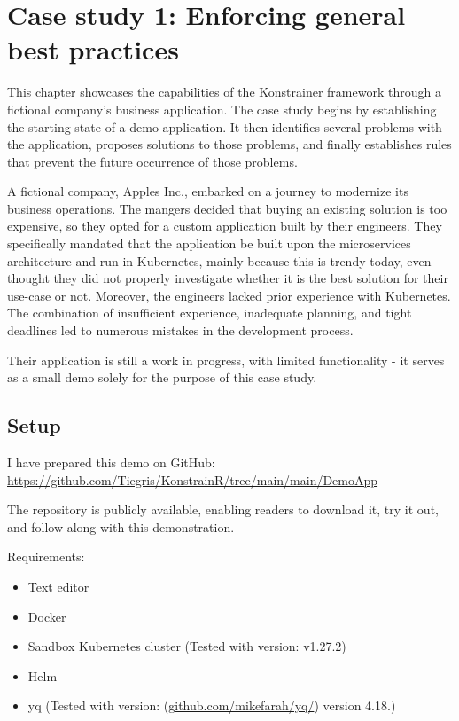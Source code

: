 \chapter{Case study 1: Enforcing general best practices}
\label{chap:case_study1}

This chapter showcases the capabilities of the Konstrainer framework through a fictional company's business application. The case study begins by establishing the starting state of a demo application. It then identifies several problems with the application, proposes solutions to those problems, and finally establishes rules that prevent the future occurrence of those problems.

A fictional company, Apples Inc., embarked on a journey to modernize its business operations. The mangers decided that buying an existing solution is too expensive, so they opted for a custom application built by their engineers. They specifically mandated that the application be built upon the microservices architecture and run in Kubernetes, mainly because this is trendy today, even thought they did not properly investigate whether it is the best solution for their use-case or not. Moreover, the engineers lacked prior experience with Kubernetes. The combination of insufficient experience, inadequate planning, and tight deadlines led to numerous mistakes in the development process.

Their application is still a work in progress, with limited functionality - it serves as a small demo solely for the purpose of this case study.

\section{Setup}

I have prepared this demo on GitHub: \url{https://github.com/Tiegris/KonstrainR/tree/main/main/DemoApp}

The repository is publicly available, enabling readers to download it, try it out, and follow along with this demonstration. 

Requirements:

\begin{itemize}
    \item Text editor
    \item Docker
    \item Sandbox Kubernetes cluster (Tested with version: v1.27.2)
    \item Helm
    \item yq (Tested with version: (\url{github.com/mikefarah/yq/}) version 4.18.)
\end{itemize}

